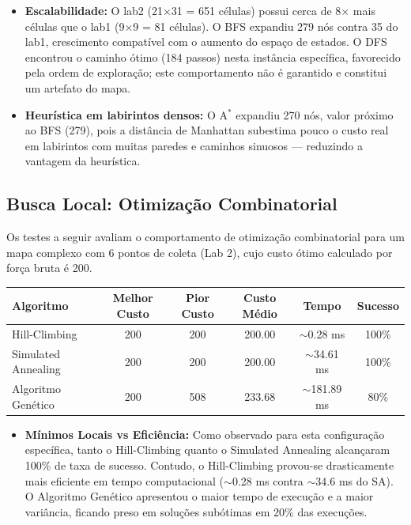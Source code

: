 \documentclass[12pt,a4paper]{article}
\begin{document}
\begin{itemize}
    \item \textbf{Escalabilidade:} O lab2 (21×31 = 651 células) possui cerca de 8× mais células que o lab1 (9×9 = 81 células). O BFS expandiu 279 nós contra 35 do lab1, crescimento compatível com o aumento do espaço de estados. O DFS encontrou o caminho ótimo (184 passos) nesta instância específica, favorecido pela ordem de exploração; este comportamento não é garantido e constitui um artefato do mapa.
    \item \textbf{Heurística em labirintos densos:} O A$^*$ expandiu 270 nós, valor próximo ao BFS (279), pois a distância de Manhattan subestima pouco o custo real em labirintos com muitas paredes e caminhos sinuosos — reduzindo a vantagem da heurística.
\end{itemize}

\subsection{Busca Local: Otimização Combinatorial}
Os testes a seguir avaliam o comportamento de otimização combinatorial para um mapa complexo com 6 pontos de coleta (Lab 2), cujo custo ótimo calculado por força bruta é 200.

\begin{table}[H]
\centering
\begin{tabular}{lccccc}
\toprule
\textbf{Algoritmo} & \textbf{Melhor Custo} & \textbf{Pior Custo} & \textbf{Custo Médio} & \textbf{Tempo} & \textbf{Sucesso} \\
\midrule
Hill-Climbing       & 200 & 200 & 200.00 & $\sim$0.28 ms  & 100\% \\
Simulated Annealing & 200 & 200 & 200.00 & $\sim$34.61 ms & 100\% \\
Algoritmo Genético  & 200 & 508 & 233.68 & $\sim$181.89 ms & 80\%  \\
\bottomrule
\end{tabular}
\end{table}

\begin{itemize}
    \item \textbf{Mínimos Locais vs Eficiência:} Como observado para esta configuração específica, tanto o Hill-Climbing quanto o Simulated Annealing alcançaram 100\% de taxa de sucesso. Contudo, o Hill-Climbing provou-se drasticamente mais eficiente em tempo computacional ($\sim$0.28 ms contra $\sim$34.6 ms do SA). O Algoritmo Genético apresentou o maior tempo de execução e a maior variância, ficando preso em soluções subótimas em 20\% das execuções.
\end{itemize}
\end{document}
